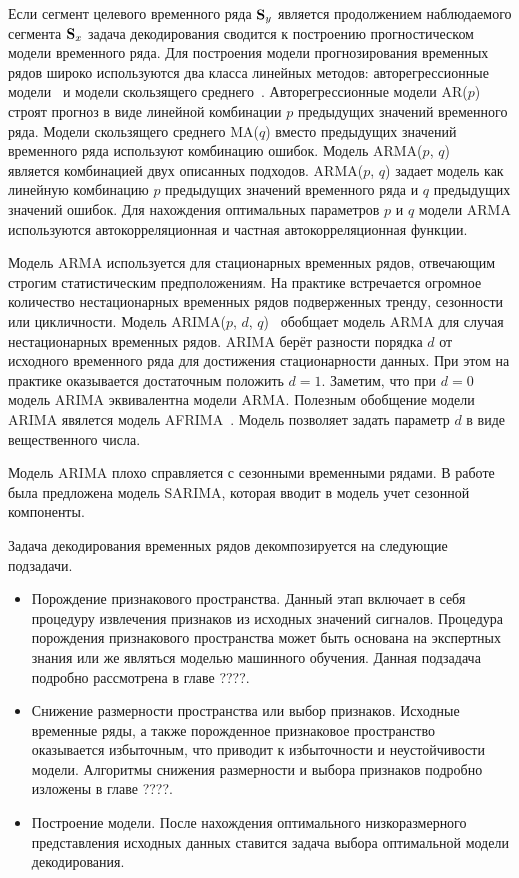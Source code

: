 Если сегмент целевого временного ряда $\mathbf{S}_y$ является продолжением наблюдаемого сегмента $\mathbf{S}_x$ задача декодирования сводится к построению прогностическом модели временного ряда.
Для построения модели прогнозирования временных рядов широко используются два класса линейных методов: авторегрессионные модели~\cite{box2011time,hipel1994time} и модели скользящего среднего~\cite{box2011time,hipel1994time}. 
Авторегрессионные модели AR($p$) строят прогноз в виде линейной комбинации $p$ предыдущих значений временного ряда.
Модели скользящего среднего MA($q$) вместо предыдущих значений временного ряда используют комбинацию ошибок.
Модель ARMA($p$, $q$)~\cite{cochrane2005time} является комбинацией двух описанных подходов. 
ARMA($p$, $q$) задает модель как линейную комбинацию $p$ предыдущих значений временного ряда и $q$ предыдущих значений ошибок. 
Для нахождения оптимальных параметров $p$ и $q$ модели ARMA используются автокорреляционная и частная автокорреляционная функции. 

Модель ARMA используется для стационарных временных рядов, отвечающим строгим статистическим предположениям. 
На практике встречается огромное количество нестационарных временных рядов подверженных тренду, сезонности или цикличности.
Модель ARIMA($p$, $d$, $q$)~\cite{cochrane2005time} обобщает модель ARMA для случая нестационарных временных рядов.
ARIMA берёт разности порядка $d$ от исходного временного ряда для достижения стационарности данных. 
При этом на практике оказывается достаточным положить $d = 1$.
Заметим, что при $d = 0$ модель ARIMA эквивалентна модели ARMA. 
Полезным обобщение модели ARIMA явялется модель AFRIMA~\cite{galbraith2001autoregression}. 
Модель позволяет задать параметр $d$ в виде вещественного числа.

Модель ARIMA плохо справляется с сезонными временными рядами.
В работе~\cite{box2011time} была предложена модель SARIMA, которая вводит в модель учет сезонной компоненты.

Задача декодирования временных рядов декомпозируется на следующие подзадачи.
\begin{itemize}
	\item Порождение признакового пространства. 
	Данный этап включает в себя процедуру извлечения признаков из исходных значений сигналов. 
	Процедура порождения признакового пространства может быть основана на экспертных знания или же являться моделью машинного обучения. 
	Данная подзадача подробно рассмотрена в главе {\color{red} ????}.
	
	\item Снижение размерности пространства или выбор признаков. 
	Исходные временные ряды, а также порожденное признаковое пространство оказывается избыточным, что приводит к избыточности и неустойчивости модели. 
	Алгоритмы снижения размерности и выбора признаков подробно изложены в главе {\color{red} ????}.
	
	\item Построение модели.
	После нахождения оптимального низкоразмерного представления исходных данных ставится задача выбора оптимальной модели декодирования.
\end{itemize}

